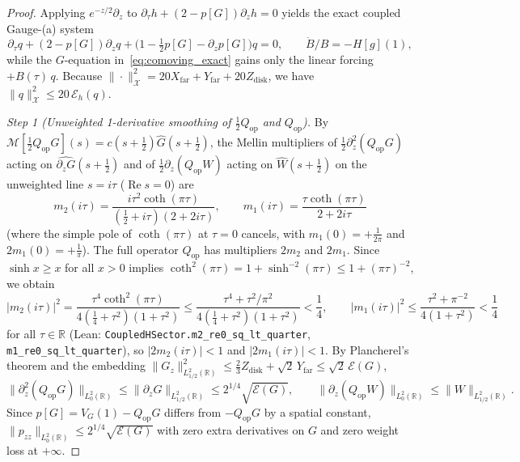 \documentclass[11pt,a4paper]{article}
\begin{document}
\begin{proof}
Applying $e^{-z/2}\partial_z$ to $\partial_\tau h + (2-p[G])\partial_z h = 0$ yields the exact coupled
Gauge-(a) system
\[
\partial_\tau q + (2-p[G])\partial_z q + \bigl(1 - \tfrac12 p[G] - \partial_z p[G]\bigr)q = 0,
\qquad
\dot B/B = -H[g](1),
\]
while the $G$-equation in~\eqref{eq:comoving_exact} gains only the linear forcing $+B(\tau)\,q$.
Because $\|\cdot\|_{\mathcal{X}}^2 = 20 X_{\mathrm{far}} + Y_{\mathrm{far}} + 20 Z_{\mathrm{disk}}$,
we have $\|q\|_{\mathcal{X}}^2 \le 20\,\mathcal{E}_h(q)$.

\emph{Step 1 (Unweighted 1-derivative smoothing of $\tfrac12 Q_{\mathrm{op}}$ and $Q_{\mathrm{op}}$).}
By $\mathcal{M}[\tfrac12 Q_{\mathrm{op}}G](s) = c(s+\tfrac12)\widehat{G}(s+\tfrac12)$, the Mellin multipliers
of $\tfrac12\partial_z^2(Q_{\mathrm{op}}G)$ acting on $\widehat{\partial_z G}(s+\tfrac12)$ and of
$\tfrac12\partial_z(Q_{\mathrm{op}}W)$ acting on $\widehat{W}(s+\tfrac12)$ on the unweighted line
$s=i\tau$ ($\operatorname{Re} s = 0$) are
\[
m_2(i\tau) = \frac{i\tau^2\coth(\pi\tau)}{(\tfrac12+i\tau)(2+2i\tau)},\qquad
m_1(i\tau) = \frac{\tau\coth(\pi\tau)}{2+2i\tau}
\]
(where the simple pole of $\coth(\pi\tau)$ at $\tau=0$ cancels, with $m_1(0) = +\frac{1}{2\pi}$ and $2m_1(0)=+\frac{1}{\pi}$).
The full operator $Q_{\mathrm{op}}$ has multipliers $2m_2$ and $2m_1$.
Since $\sinh x \ge x$ for all $x>0$ implies $\coth^2(\pi\tau) = 1 + \sinh^{-2}(\pi\tau) \le 1 + (\pi\tau)^{-2}$,
we obtain
\[
|m_2(i\tau)|^2 = \frac{\tau^4\coth^2(\pi\tau)}{4(\tfrac14+\tau^2)(1+\tau^2)}
  \le \frac{\tau^4 + \tau^2/\pi^2}{4(\tfrac14+\tau^2)(1+\tau^2)} < \frac{1}{4},
\qquad
|m_1(i\tau)|^2 \le \frac{\tau^2 + \pi^{-2}}{4(1+\tau^2)} < \frac{1}{4}
\]
for all $\tau\in\mathbb{R}$ (Lean: \texttt{CoupledHSector.\allowbreak m2\_re0\_sq\_lt\_quarter},
\texttt{m1\_re0\_sq\_lt\_quarter}), so $|2m_2(i\tau)| < 1$ and $|2m_1(i\tau)| < 1$.
By Plancherel's theorem and the embedding $\|G_z\|_{L^2_{1/2}(\mathbb{R})}^2 \le \frac{2}{3}Z_{\mathrm{disk}} + \sqrt{2}\,Y_{\mathrm{far}} \le \sqrt{2}\,\mathcal{E}(G)$,
\[
\|\partial_z^2(Q_{\mathrm{op}}G)\|_{L^2_0(\mathbb{R})} \le \|\partial_z G\|_{L^2_{1/2}(\mathbb{R})}
  \le 2^{1/4}\sqrt{\mathcal{E}(G)},
\qquad
\|\partial_z(Q_{\mathrm{op}}W)\|_{L^2_0(\mathbb{R})} \le \|W\|_{L^2_{1/2}(\mathbb{R})}.
\]
Since $p[G] = V_G(1) - Q_{\mathrm{op}}G$ differs from $-Q_{\mathrm{op}}G$ by a spatial constant,
$\|p_{zz}\|_{L^2_0(\mathbb{R})} \le 2^{1/4}\sqrt{\mathcal{E}(G)}$
with zero extra derivatives on $G$ and zero weight loss at $+\infty$.


\end{proof}
\end{document}
